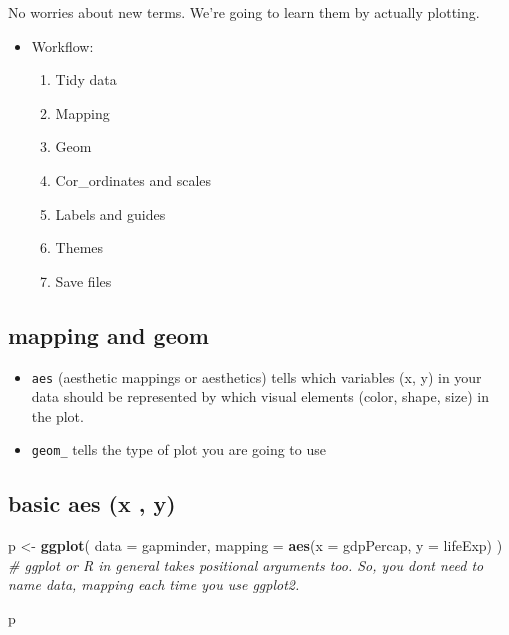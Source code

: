 \documentclass[
]{book}
\newenvironment{Shaded}{\begin{snugshade}}{\end{snugshade}}
\newcommand{\CommentTok}[1]{\textcolor[rgb]{0.56,0.35,0.01}{\textit{#1}}}
\newcommand{\DataTypeTok}[1]{\textcolor[rgb]{0.13,0.29,0.53}{#1}}
\newcommand{\KeywordTok}[1]{\textcolor[rgb]{0.13,0.29,0.53}{\textbf{#1}}}
\newcommand{\NormalTok}[1]{#1}
\newcommand{\StringTok}[1]{\textcolor[rgb]{0.31,0.60,0.02}{#1}}
\providecommand{\tightlist}{%
  \setlength{\itemsep}{0pt}\setlength{\parskip}{0pt}}
\begin{document}
No worries about new terms. We're going to learn them by actually plotting.

\begin{itemize}
\item
  Workflow:

  \begin{enumerate}
  \def\labelenumi{\arabic{enumi}.}
  \tightlist
  \item
    Tidy data
  \item
    Mapping
  \item
    Geom
  \item
    Cor\_ordinates and scales
  \item
    Labels and guides
  \item
    Themes
  \item
    Save files
  \end{enumerate}
\end{itemize}

\hypertarget{mapping-and-geom}{%
\subsection{mapping and geom}\label{mapping-and-geom}}

\begin{itemize}
\item
  \texttt{aes} (aesthetic mappings or aesthetics) tells which variables (x, y) in your data should be represented by which visual elements (color, shape, size) in the plot.
\item
  \texttt{geom\_} tells the type of plot you are going to use
\end{itemize}

\hypertarget{basic-aes-x-y}{%
\subsection{basic aes (x , y)}\label{basic-aes-x-y}}

\begin{Shaded}
\begin{Highlighting}[]
\NormalTok{p \textless{}{-}}\StringTok{ }\KeywordTok{ggplot}\NormalTok{(}
  \DataTypeTok{data =}\NormalTok{ gapminder,}
  \DataTypeTok{mapping =} \KeywordTok{aes}\NormalTok{(}\DataTypeTok{x =}\NormalTok{ gdpPercap, }\DataTypeTok{y =}\NormalTok{ lifeExp)}
\NormalTok{) }\CommentTok{\# ggplot or R in general takes positional arguments too. So, you don\textquotesingle{}t need to name data, mapping each time you use ggplot2.}

\NormalTok{p}
\end{Highlighting}
\end{Shaded}
\end{document}
